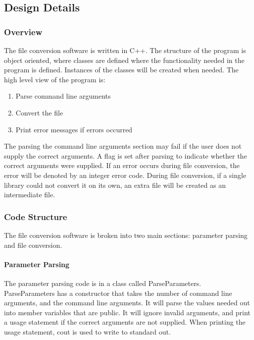     \subsection{Design Details}

    \subsubsection{Overview}

    The file conversion software is written in C++.  The structure of the program is object oriented, where classes are defined where the functionality needed
    in the program is defined.  Instances of the classes will be created when needed.  
    The high level view of the program is:
    \begin{enumerate}
        \item Parse command line arguments
        \item Convert the file
        \item Print error messages if errors occurred
    \end{enumerate}

    The parsing the command line arguments section may fail if the user does not supply the correct arguments.  A flag is set after parsing to indicate
    whether the correct arguments were supplied.  If an error occurs during file conversion, the error will be denoted by an integer error code.  
    During file conversion, if a single library could not convert it on its own, an extra file will be created as an intermediate file.

    \subsubsection{Code Structure}
    The file conversion software is broken into two main sections: parameter parsing and file conversion.

    \paragraph{Parameter Parsing}
    \hfill \break
    The parameter parsing code is in a class called ParseParameters.  ParseParameters has a constructor that takes the number of command line arguments, 
    and the command line arguments.  It will parse the values needed out into member variables that are public.  It will ignore invalid arguments,
    and print a usage statement if the correct arguments are not supplied.  When printing the usage statement, cout is used to write to standard out.

